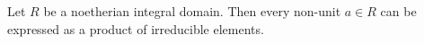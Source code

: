 Let $R$ be a noetherian integral domain. Then every non-unit $a \in R$ can be expressed as a product of irreducible elements.
